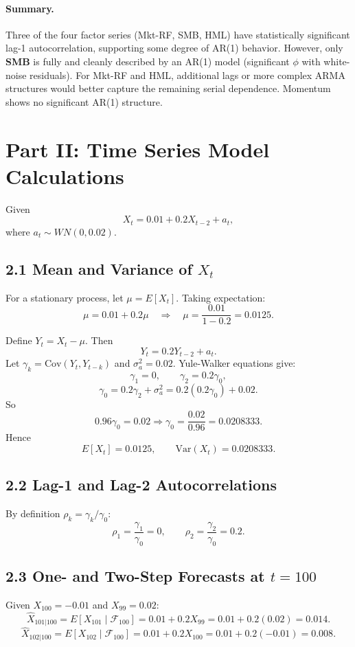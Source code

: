 \documentclass[12pt]{article}
\begin{document}
	\paragraph{Summary.}
	Three of the four factor series (Mkt-RF, SMB, HML) have statistically significant lag-1 autocorrelation, supporting some degree of AR(1) behavior. However, only \textbf{SMB} is fully and cleanly described by an AR(1) model (significant $\phi$ with white-noise residuals). For Mkt-RF and HML, additional lags or more complex ARMA structures would better capture the remaining serial dependence. Momentum shows no significant AR(1) structure.
	
	\newpage
	\section{Part II: Time Series Model Calculations}
	
	Given
	\[
	X_t = 0.01 + 0.2X_{t-2} + a_t,
	\]
	where $a_t \sim WN(0,0.02)$.
	
	\subsection{2.1 Mean and Variance of $X_t$}
	For a stationary process, let $\mu = E[X_t]$. Taking expectation:
	\[
	\mu = 0.01 + 0.2\mu \quad \Rightarrow \quad \mu = \frac{0.01}{1-0.2} = 0.0125.
	\]
	
	Define $Y_t = X_t - \mu$. Then
	\[
	Y_t = 0.2Y_{t-2} + a_t.
	\]
	Let $\gamma_k = \text{Cov}(Y_t, Y_{t-k})$ and $\sigma_a^2 = 0.02$. Yule-Walker equations give:
	\[
	\gamma_1 = 0, \qquad \gamma_2 = 0.2\gamma_0,
	\]
	\[
	\gamma_0 = 0.2\gamma_2 + \sigma_a^2 = 0.2(0.2\gamma_0)+0.02.
	\]
	So
	\[
	0.96\gamma_0 = 0.02 \Rightarrow \gamma_0 = \frac{0.02}{0.96}=0.0208333.
	\]
	Hence
	\[
	E[X_t]=0.0125, \qquad \mathrm{Var}(X_t)=0.0208333.
	\]
	
	\subsection{2.2 Lag-1 and Lag-2 Autocorrelations}
	By definition $\rho_k = \gamma_k/\gamma_0$:
	\[
	\rho_1 = \frac{\gamma_1}{\gamma_0} = 0,
	\qquad
	\rho_2 = \frac{\gamma_2}{\gamma_0} = 0.2.
	\]
	
	\subsection{2.3 One- and Two-Step Forecasts at $t=100$}
	Given $X_{100}=-0.01$ and $X_{99}=0.02$:
	\[
	\hat X_{101|100} = E[X_{101}\mid \mathcal F_{100}] = 0.01 + 0.2X_{99}
	=0.01+0.2(0.02)=0.014.
	\]
	\[
	\hat X_{102|100} = E[X_{102}\mid \mathcal F_{100}] = 0.01 + 0.2X_{100}
	=0.01+0.2(-0.01)=0.008.
	\]
	
\end{document}
